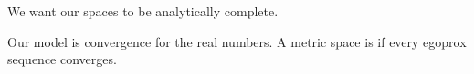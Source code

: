 

We want our spaces to be
analytically complete.


Our model is convergence for
the real numbers.
A metric space is 
if every egoprox sequence converges.
